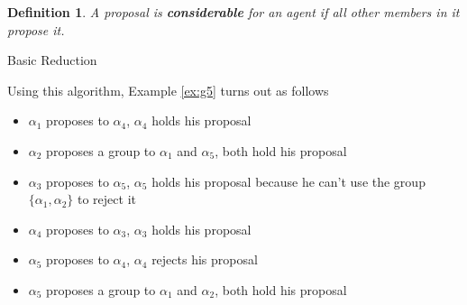 \documentclass{elsarticle}
\newtheorem{mydef}{Definition}
\newtheorem{myalg}{Algorithm}
\begin{document}
\begin{mydef}
\label{def:cons}
A proposal is \textbf{considerable} for an agent if all other members in it propose it.
\end{mydef}




\begin{algorithm}[H]
    \caption{Basic Reduction\label{alg:bas}}
\end{algorithm}
    

Using this algorithm, Example \ref{ex:g5} turns out as follows

\begin{itemize}
\item $\alpha_1$ proposes to $\alpha_4$, $\alpha_4$ holds his proposal
\item $\alpha_2$ proposes a group to $\alpha_1$ and $\alpha_5$, both hold his proposal
\item $\alpha_3$ proposes to $\alpha_5$, $\alpha_5$ holds his proposal because he can't use the group $\{ \alpha_1 , \alpha_2 \}$ to reject it
\item $\alpha_4$ proposes to $\alpha_3$, $\alpha_3$ holds his proposal
\item $\alpha_5$ proposes to $\alpha_4$, $\alpha_4$ rejects his proposal
\item $\alpha_5$ proposes a group to $\alpha_1$ and $\alpha_2$, both hold his proposal
\end{itemize}
\end{document}
